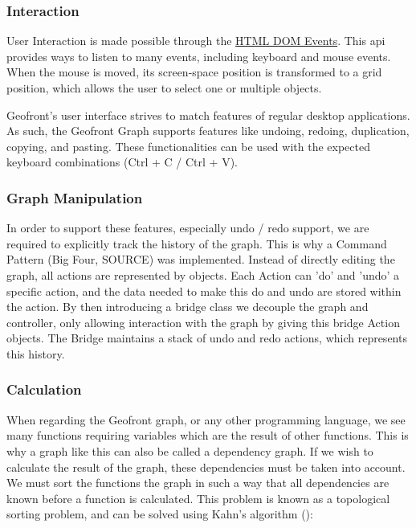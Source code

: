 \subsubsection{ Interaction }
User Interaction is made possible through the \href{https://developer.mozilla.org/en-US/docs/web/api/event}{HTML DOM Events}. 
This api provides ways to listen to many events, including keyboard and mouse events. 
When the mouse is moved, its screen-space position is transformed to a grid position, which allows the user to select one or multiple objects. 

Geofront's user interface strives to match features of regular desktop applications. 
As such, the Geofront Graph supports features like undoing, redoing, duplication, copying, and pasting. 
These functionalities can be used with the expected keyboard combinations (Ctrl + C / Ctrl + V).

\subsubsection*{ Graph Manipulation }

In order to support these features, especially undo / redo support, we are required to explicitly track the history of the graph. 
This is why a Command Pattern (Big Four, SOURCE) was implemented.
Instead of directly editing the graph, all actions are represented by  objects. 
Each Action can 'do' and 'undo' a specific action, and the data needed to make this do and undo are stored within the action. 
By then introducing a bridge class we decouple the graph and controller, only allowing interaction with the graph by giving this bridge Action objects. The Bridge maintains a stack of undo and redo actions, which represents this history.  


\subsubsection*{Calculation}

When regarding the Geofront graph, or any other programming language, we see many functions requiring variables which are the result of other functions. 
This is why a graph like this can also be called a dependency graph. 
If we wish to calculate the result of the graph, these dependencies must be taken into account. 
We must sort the functions the graph in such a way that all dependencies are known before a function is calculated.
This problem is known as a topological sorting problem, and can be solved using Kahn's algorithm (): 

